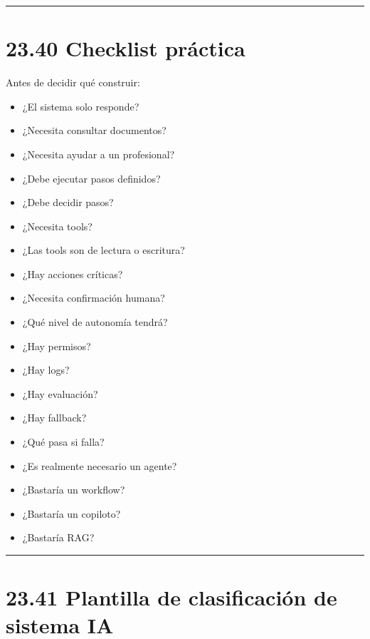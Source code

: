 \begin{center}\rule{0.5\linewidth}{0.5pt}\end{center}

\section{23.40 Checklist práctica}\label{checklist-pruxe1ctica-22}

Antes de decidir qué construir:

\begin{itemize}
\tightlist
\item
  ¿El sistema solo responde?
\item
  ¿Necesita consultar documentos?
\item
  ¿Necesita ayudar a un profesional?
\item
  ¿Debe ejecutar pasos definidos?
\item
  ¿Debe decidir pasos?
\item
  ¿Necesita tools?
\item
  ¿Las tools son de lectura o escritura?
\item
  ¿Hay acciones críticas?
\item
  ¿Necesita confirmación humana?
\item
  ¿Qué nivel de autonomía tendrá?
\item
  ¿Hay permisos?
\item
  ¿Hay logs?
\item
  ¿Hay evaluación?
\item
  ¿Hay fallback?
\item
  ¿Qué pasa si falla?
\item
  ¿Es realmente necesario un agente?
\item
  ¿Bastaría un workflow?
\item
  ¿Bastaría un copiloto?
\item
  ¿Bastaría RAG?
\end{itemize}

\begin{center}\rule{0.5\linewidth}{0.5pt}\end{center}

\section{23.41 Plantilla de clasificación de sistema
IA}\label{plantilla-de-clasificaciuxf3n-de-sistema-ia}

